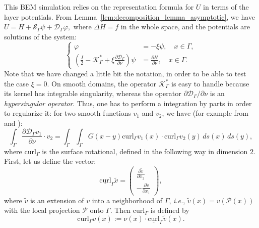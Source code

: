 \documentclass[final]{siamltex}
\numberwithin{equation}{section}
\numberwithin{figure}{section}
\numberwithin{table}{section}
\begin{document}
This BEM simulation relies on the representation formula for $U$
in terms of the layer potentials. From
Lemma~\ref{lem:decomposition_lemma_asymptotic}, we have
$U=H+\mathcal{S}_{\Gamma}\psi+\mathcal{D}_{\Gamma}\varphi,$ where
$\Delta H={f}$ in the whole space, and the potentials are
solutions of the system:
\begin{equation}
\left\{ \begin{alignedat}{1}\varphi & =-\xi\psi, \quad x \in \Gamma, \\
\left(\frac{I}{2}-\mathcal{K}_{\Gamma}^{*}+\xi\frac{\partial\mathcal{D}_{\Gamma}}
{\partial\nu}\right)\psi & =\frac{\partial H}{\partial\nu}, \quad
x \in \Gamma.
\end{alignedat}
\right.\label{eq:system_potential_U}
\end{equation}
Note that we have changed a little bit the notation, in order to
 be able to test the case $\xi=0$.
On smooth domains, the operator $\mathcal{K}_{\Gamma}^{*}$ is easy
to handle because its kernel has integrable singularity, whereas
the operator $\partial\mathcal{D}_{\Gamma}/\partial\nu$ is an
\emph{hypersingular operator}. Thus, one has to perform a
integration by parts in order to regularize it: for two smooth
functions $v_{1}$ and $v_{2}$, we have (for example from
\cite[Theorem 1]{nedelec1982integral} and \cite[Theorem
6.15]{steinbach2008numerical}):
\begin{equation}
\int_\Gamma \frac{\partial\mathcal{D}_{\Gamma} v_{1}}{\partial\nu}
\cdot v_{2}
=\int_{\Gamma}\int_{\Gamma}G(x-y)\textrm{curl}_{\Gamma}v_{1}
(x)\cdot\textrm{curl}_{\Gamma}v_{2}(y)\, ds(x)\, ds(y),
\label{eq:hypersingular-integration-by-parts}
\end{equation}
where $\textrm{curl}_{\Gamma}$ is the surface rotational, defined
in the following way in dimension $2$. First, let us define the
vector:
\[
\underline{\textrm{curl}}_{\Gamma}\tilde{v}=\left(\begin{alignedat}{1}\frac{\partial\tilde{v}}{\partial x_{2}}\\
-\frac{\partial\tilde{v}}{\partial x_{1}}
\end{alignedat}
\right),
\]
where $\tilde{v}$ is an extension of $v$ into a neighborhood of
$\Gamma$, \emph{i.e.}, $\tilde{v}(x)=v\left(\mathcal{P}(x)\right)$
with  the local projection $\mathcal{P}$ onto $\Gamma$. Then $
$$\textrm{curl}_{\Gamma}$ is defined by
\[
\textrm{curl}_{\Gamma}v(x):=\nu(x)\cdot\underline{\textrm{curl}}_{\Gamma}\tilde{v}(x).
\]
\end{document}
